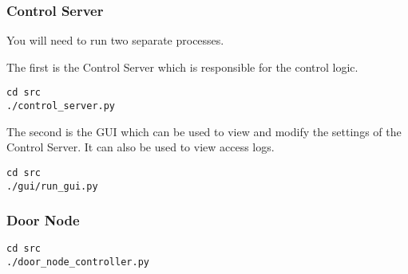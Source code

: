 \subsubsection{Control Server}

You will need to run two separate processes.

\noindent
The first is the Control Server which is responsible for the control logic.

\begin{lstlisting}
cd src
./control_server.py
\end{lstlisting}

\noindent
The second is the GUI which can be used to view and modify the settings of the
Control Server. It can also be used to view access logs.

\begin{lstlisting}
cd src
./gui/run_gui.py
\end{lstlisting}

\subsubsection{Door Node}

\begin{lstlisting}
cd src
./door_node_controller.py
\end{lstlisting}

